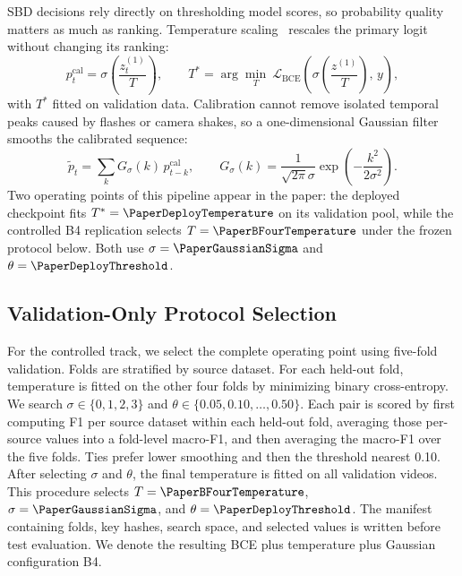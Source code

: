SBD decisions rely directly on thresholding model scores, so probability
quality matters as much as ranking. Temperature
scaling~\cite{guo2017calibration} rescales the primary logit without
changing its ranking:
\begin{equation}
    p^{\mathrm{cal}}_t=\sigma\!\left(\frac{z^{(1)}_t}{T}\right),\qquad
    T^{*}=\arg\min_{T}\ \mathcal{L}_{\mathrm{BCE}}\!\left(\sigma\!\left(\frac{z^{(1)}}{T}\right),\,y\right),
    \label{eq:temperature}
\end{equation}
with $T^{*}$ fitted on validation data. Calibration cannot remove isolated
temporal peaks caused by flashes or camera shakes, so a one-dimensional
Gaussian filter smooths the calibrated sequence:
\begin{equation}
    \tilde p_t=\sum_k G_{\sigma}(k)\,p^{\mathrm{cal}}_{t-k},\qquad
    G_{\sigma}(k)=\frac{1}{\sqrt{2\pi}\sigma}\exp\!\left(-\frac{k^2}{2\sigma^2}\right).
    \label{eq:gaussian}
\end{equation}
Two operating points of this pipeline appear in the paper: the deployed
checkpoint fits $T^{*}=\PaperDeployTemperature$ on its validation pool,
while the controlled B4 replication selects $T=\PaperBFourTemperature$
under the frozen protocol below. Both use $\sigma=\PaperGaussianSigma$ and
$\theta=\PaperDeployThreshold$.

\subsection{Validation-Only Protocol Selection}
\label{sec:protocol}

For the controlled track, we select the complete operating point using
five-fold validation. Folds are stratified by source dataset. For each
held-out fold, temperature is fitted on the other four folds by minimizing
binary cross-entropy. We search $\sigma\in\{0,1,2,3\}$ and
$\theta\in\{0.05,0.10,\ldots,0.50\}$. Each pair is scored by first computing
F1 per source dataset within each held-out fold, averaging those per-source
values into a fold-level macro-F1, and then averaging the macro-F1 over the
five folds. Ties prefer lower smoothing and then the threshold nearest 0.10.
After selecting $\sigma$ and $\theta$, the final temperature is fitted on
all validation videos. This procedure selects $T=\PaperBFourTemperature$,
$\sigma=\PaperGaussianSigma$, and $\theta=\PaperDeployThreshold$. The
manifest containing folds, key hashes, search space, and selected values is
written before test evaluation. We denote the resulting BCE plus temperature
plus Gaussian configuration B4.

